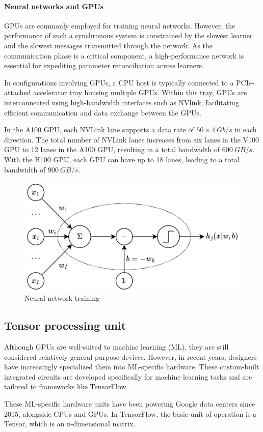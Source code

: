 \paragraph*{Neural networks and GPUs}
GPUs are commonly employed for training neural networks. 
However, the performance of such a synchronous system is constrained by the slowest learner and the slowest messages transmitted through the network. 
As the communication phase is a critical component, a high-performance network is essential for expediting parameter reconciliation across learners.

In configurations involving GPUs, a CPU host is typically connected to a PCIe-attached accelerator tray housing multiple GPUs. 
Within this tray, GPUs are interconnected using high-bandwidth interfaces such as NVlink, facilitating efficient communication and data exchange between the GPUs.

In the A100 GPU, each NVLink lane supports a data rate of $50 \times 4\:Gb/s$ in each direction. 
The total number of NVLink lanes increases from six lanes in the V100 GPU to 12 lanes in the A100 GPU, resulting in a total bandwidth of $600\:GB/s$. 
With the H100 GPU, each GPU can have up to 18 lanes, leading to a total bandwidth of $900\:GB/s$.
\begin{figure}[H]
    \centering
    \includegraphics[width=0.5\linewidth]{images/neuron.png}
    \caption{Neural network training}
\end{figure}

\subsection{Tensor processing unit}
Although GPUs are well-suited to machine learning (ML), they are still considered relatively general-purpose devices. 
However, in recent years, designers have increasingly specialized them into ML-specific hardware. 
These custom-built integrated circuits are developed specifically for machine learning tasks and are tailored to frameworks like TensorFlow.

These ML-specific hardware units have been powering Google data centers since 2015, alongside CPUs and GPUs. 
In TensorFlow, the basic unit of operation is a Tensor, which is an n-dimensional matrix.

